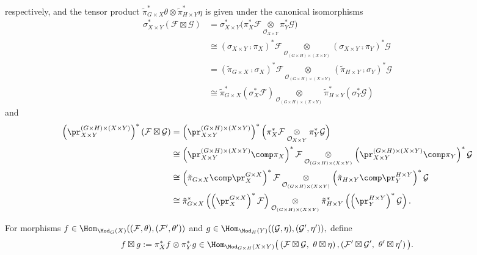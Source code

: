 \begin{defn}
respectively,
and
the tensor product
$
\tilde{\pi}_{G\times X}^*\theta\otimes\tilde{\pi}_{H\times Y}^*\eta
$
is given under the canonical isomorphisms
\begin{align*}
\sigma_{X\times Y}^*(\mathcal{F}\boxtimes\mathcal{G})
&=
\sigma_{X\times Y}^*
\Big(
\pi_X^*\mathcal{F}
\underset{\mathcal{O}_{X\times Y}}{\otimes}
\pi_Y^*\mathcal{G}
\Big)
\\[2mm]
&\cong
(\sigma_{X\times Y}\comp\pi_X)^*\mathcal{F}
\underset{\mathcal{O}_{(G\times H)\times(X\times Y)}}{\otimes}
(\sigma_{X\times Y}\comp\pi_Y)^*\mathcal{G}
\\[2mm]
&=
(\tilde{\pi}_{G\times X}\comp \sigma_X)^*\mathcal{F}
\underset{\mathcal{O}_{(G\times H)\times(X\times Y)}}{\otimes}
(\tilde{\pi}_{H\times Y}\comp \sigma_Y)^*\mathcal{G}
\\[2mm]
&\cong
\tilde{\pi}_{G\times X}^*\left(\sigma_X^*\mathcal{F}\right)
\underset{\mathcal{O}_{(G\times H)\times(X\times Y)}}{\otimes}
\tilde{\pi}_{H\times Y}^*\left(\sigma_Y^*\mathcal{G}\right)
\end{align*}
and
\begin{align*}
\left(\pr_{X\times Y}^{(G\times H)\times(X\times Y)}\right)^*
(\mathcal{F}\boxtimes\mathcal{G})
&=
\left(\pr_{X\times Y}^{(G\times H)\times(X\times Y)}\right)^*
\Big(
\pi_X^*\mathcal{F}
\underset{\mathcal{O}_{X\times Y}}{\otimes}
\pi_Y^*\mathcal{G}
\Big)
\\
&\cong
\left(\pr_{X\times Y}^{(G\times H)\times(X\times Y)}\comp\pi_X\right)^*\mathcal{F}
\underset{\mathcal{O}_{(G\times H)\times(X\times Y)}}{\otimes}
\left(\pr_{X\times Y}^{(G\times H)\times(X\times Y)}\comp\pi_Y\right)^*\mathcal{G}
\\
&\cong
\left(\tilde{\pi}_{G\times X}\comp\pr_X^{G\times X}\right)^*\mathcal{F}
\underset{\mathcal{O}_{(G\times H)\times(X\times Y)}}{\otimes}
\left(\tilde{\pi}_{H\times Y}\comp\pr_Y^{H\times Y}\right)^*\mathcal{G}
\\
&\cong
\tilde{\pi}_{G\times X}^*\left(\left(\pr_X^{G\times X}\right)^*\mathcal{F}\right)
\underset{\mathcal{O}_{(G\times H)\times(X\times Y)}}{\otimes}
\tilde{\pi}_{H\times Y}^*\left(\left(\pr_Y^{H\times Y}\right)^*\mathcal{G}\right).
\end{align*}







For morphisms
$
f
\in
\Hom_{\Mod_G(X)}
((\mathcal{F},\theta),(\mathcal{F}',\theta'))
$
and
$
g
\in
\Hom_{\Mod_H(Y)}
((\mathcal{G},\eta),(\mathcal{G}',\eta')),
$
define
$$
f\boxtimes g
:=
\pi_X^*f
\otimes
\pi_Y^*g
\in
\Hom_{\Mod_{G\times H}(X\times Y)}
\big(
\left(
\mathcal{F}\boxtimes\mathcal{G},
\
\theta\boxtimes\eta
\right),
\left(
\mathcal{F}'\boxtimes\mathcal{G}',
\
\theta'\boxtimes\eta'
\right)
\big).
$$


\end{defn}
